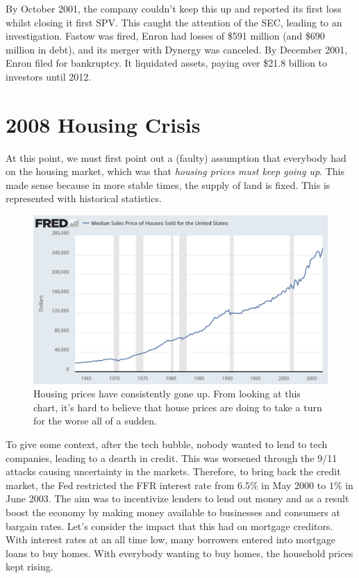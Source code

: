 \documentclass{article}
\begin{document}
  By October 2001, the company couldn't keep this up and reported its first loss whilst closing it first SPV. This caught the attention of the SEC, leading to an investigation. Fastow was fired, Enron had losses of \$591 million (and \$690 million in debt), and its merger with Dynergy was canceled. By December 2001, Enron filed for bankruptcy. It liquidated assets, paying over \$21.8 billion to investors until 2012. 


\section{2008 Housing Crisis}

  At this point, we must first point out a (faulty) assumption that everybody had on the housing market, which was that \textit{housing prices must keep going up}. This made sense because in more stable times, the supply of land is fixed. This is represented with historical statistics. 
  
  \begin{figure}[H]
    \centering 
    \includegraphics[scale=0.4]{img/housing.png}
    \caption{Housing prices have consistently gone up. From looking at this chart, it's hard to believe that house prices are doing to take a turn for the worse all of a sudden. } 
    \label{fig:housing}
  \end{figure}

  To give some context, after the tech bubble, nobody wanted to lend to tech companies, leading to a dearth in credit. This was worsened through the 9/11 attacks causing uncertainty in the markets. Therefore, to bring back the credit market, the Fed restricted the FFR interest rate from $6.5\%$ in May 2000 to $1\%$ in June 2003. The aim was to incentivize lenders to lend out money and as a result boost the economy by making money available to businesses and consumers at bargain rates. Let's consider the impact that this had on mortgage creditors. With interest rates at an all time low, many borrowers entered into mortgage loans to buy homes. With everybody wanting to buy homes, the household prices kept rising. 
\end{document}
